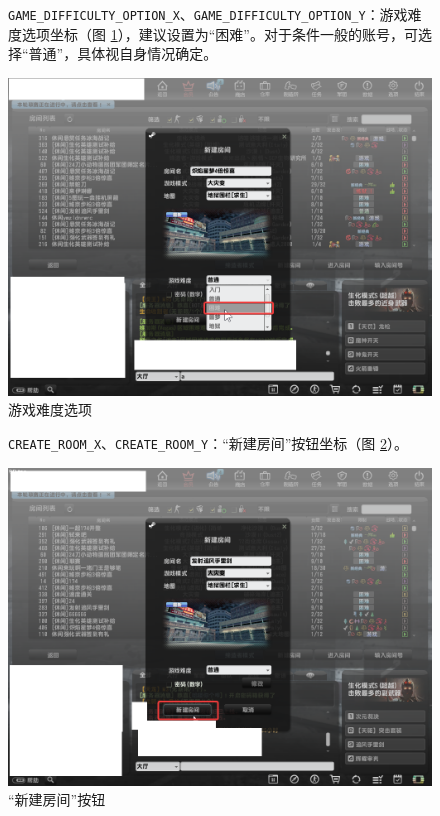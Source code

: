 \begin{figure}[H]
    \Centering
    \parbox[l]{\textwidth}{\lstinline{GAME_DIFFICULTY_OPTION_X}、\lstinline{GAME_DIFFICULTY_OPTION_Y}：游戏难度选项坐标（图 \ref{ch2fig-difficulty-option}），建议设置为“困难”。对于条件一般的账号，可选择“普通”，具体视自身情况确定。}
    \includegraphics[width=\textwidth]{docs/assets/difficulty_option.png}
    \caption{游戏难度选项}
    \label{ch2fig-difficulty-option}
\end{figure}

\begin{figure}[H]
    \Centering
    \parbox[l]{\textwidth}{\lstinline{CREATE_ROOM_X}、\lstinline{CREATE_ROOM_Y}：“新建房间”按钮坐标（图 \ref{ch2fig-create-room-1}）。}
    \includegraphics[width=\textwidth]{docs/assets/create_room_1.png}
    \caption{“新建房间”按钮}
    \label{ch2fig-create-room-1}
\end{figure}

